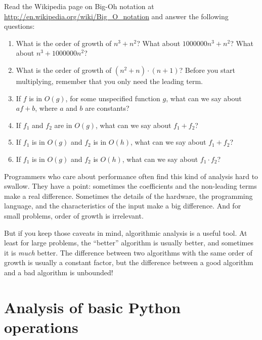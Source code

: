 \documentclass[10pt]{book}
\begin{document}
\begin{exercise}

Read the Wikipedia page on Big-Oh notation at
\url{http://en.wikipedia.org/wiki/Big_O_notation} and
answer the following questions:

\begin{enumerate}
\item What is the order of growth of $n^3 + n^2$?
What about $1000000 n^3 + n^2$?
What about $n^3 + 1000000 n^2$?

\item What is the order of growth of $(n^2 + n) \cdot (n + 1)$?  Before
  you start multiplying, remember that you only need the leading term.

\item If $f$ is in $O(g)$, for some unspecified function $g$, what can
  we say about $af+b$, where $a$ and $b$ are constants?

\item If $f_1$ and $f_2$ are in $O(g)$, what can we say about $f_1 + f_2$?

\item If  $f_1$ is in $O(g)$
and $f_2$ is in $O(h)$,
what can we say about  $f_1 + f_2$?

\item If  $f_1$ is in $O(g)$ and $f_2$ is $O(h)$,
what can we say about  $f_1 \cdot f_2$?
\end{enumerate}

\end{exercise}

Programmers who care about performance often find this kind of
analysis hard to swallow.  They have a point: sometimes the
coefficients and the non-leading terms make a real difference.
Sometimes the details of the hardware, the programming language, and
the characteristics of the input make a big difference.  And for small
problems, order of growth is irrelevant.

But if you keep those caveats in mind, algorithmic analysis is a
useful tool.  At least for large problems, the ``better'' algorithm
is usually better, and sometimes it is {\em much} better.  The
difference between two algorithms with the same order of growth is
usually a constant factor, but the difference between a good algorithm
and a bad algorithm is unbounded!


\section{Analysis of basic Python operations}
\end{document}
